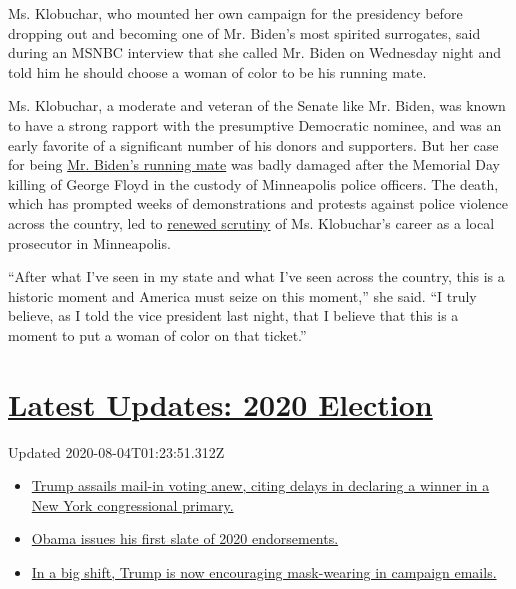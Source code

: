 Ms. Klobuchar, who mounted her own campaign for the presidency before
dropping out and becoming one of Mr. Biden's most spirited surrogates,
said during an MSNBC interview that she called Mr. Biden on Wednesday
night and told him he should choose a woman of color to be his running
mate.

Ms. Klobuchar, a moderate and veteran of the Senate like Mr. Biden, was
known to have a strong rapport with the presumptive Democratic nominee,
and was an early favorite of a significant number of his donors and
supporters. But her case for being
\href{https://www.nytimes3xbfgragh.onion/2020/06/26/us/politics/biden-vice-president-voters.html}{Mr.
Biden's running mate} was badly damaged after the Memorial Day killing
of George Floyd in the custody of Minneapolis police officers. The
death, which has prompted weeks of demonstrations and protests against
police violence across the country, led to
\href{https://www.nytimes3xbfgragh.onion/2020/05/29/us/politics/klobuchar-minneapolis-george-floyd.html}{renewed
scrutiny} of Ms. Klobuchar's career as a local prosecutor in
Minneapolis.

``After what I've seen in my state and what I've seen across the
country, this is a historic moment and America must seize on this
moment,'' she said. ``I truly believe, as I told the vice president last
night, that I believe that this is a moment to put a woman of color on
that ticket.''

\hypertarget{latest-updates-2020-election}{%
\section{\texorpdfstring{\href{https://www.nytimes3xbfgragh.onion/2020/08/03/us/elections/biden-vs-trump.html?action=click\&pgtype=Article\&state=default\&region=MAIN_CONTENT_1\&context=storylines_live_updates}{Latest
Updates: 2020
Election}}{Latest Updates: 2020 Election}}\label{latest-updates-2020-election}}

Updated 2020-08-04T01:23:51.312Z

\begin{itemize}
\tightlist
\item
  \href{https://www.nytimes3xbfgragh.onion/2020/08/03/us/elections/biden-vs-trump.html?action=click\&pgtype=Article\&state=default\&region=MAIN_CONTENT_1\&context=storylines_live_updates\#link-6494b448}{Trump
  assails mail-in voting anew, citing delays in declaring a winner in a
  New York congressional primary.}
\item
  \href{https://www.nytimes3xbfgragh.onion/2020/08/03/us/elections/biden-vs-trump.html?action=click\&pgtype=Article\&state=default\&region=MAIN_CONTENT_1\&context=storylines_live_updates\#link-3de249e6}{Obama
  issues his first slate of 2020 endorsements.}
\item
  \href{https://www.nytimes3xbfgragh.onion/2020/08/03/us/elections/biden-vs-trump.html?action=click\&pgtype=Article\&state=default\&region=MAIN_CONTENT_1\&context=storylines_live_updates\#link-54e34d20}{In
  a big shift, Trump is now encouraging mask-wearing in campaign
  emails.}
\end{itemize}

